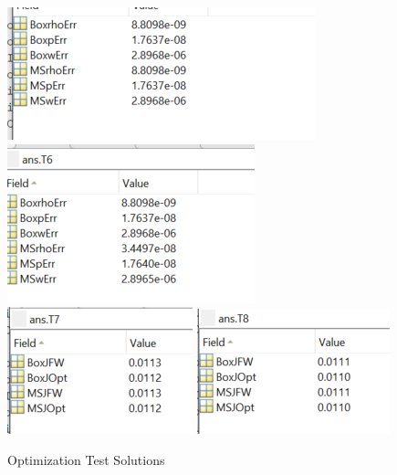 \documentclass[11pt, a4paper]{article}
\theoremstyle{definition}
\begin{document}
	\begin{figure}[h]
		\centering
		\includegraphics[scale=1]{T5.png}
		\includegraphics[scale=1]{T6.png}\\
		\includegraphics[scale=1]{T7.png}
		\includegraphics[scale=1]{T8.png}
		\caption{Optimization Test Solutions} 
		\label{F0b}
	\end{figure}
	
\end{document}

